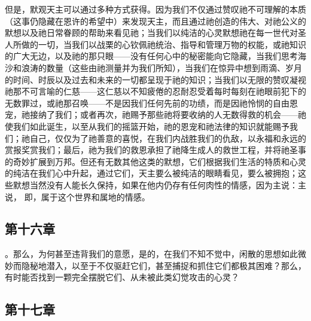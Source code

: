 \par

但是，默观天主可以通过多种方式获得。因为我们不仅通过赞叹祂不可理解的本质（这事仍隐藏在恩许的希望中）来发现天主，而且通过祂创造的伟大、对祂公义的默想以及祂日常眷顾的帮助来看见祂；当我们以纯洁的心灵默想祂在每一世代对圣人所做的一切，当我们以战栗的心钦佩祂统治、指导和管理万物的权能，或祂知识的广大无边，以及祂的那只眼——没有任何心中的秘密能向它隐藏，当我们思考海沙和浪涛的数量（这些由祂测量并为我们所知），当我们在惊异中想到雨滴、岁月的时间、时辰以及过去和未来的一切都呈现于祂的知识；当我们以无限的赞叹凝视祂那不可言喻的仁慈——这仁慈以不知疲倦的忍耐忍受着每时每刻在祂眼前犯下的无数罪过，或祂那召唤——不是因我们任何先前的功绩，而是因祂怜悯的自由恩宠，祂接纳了我们；或者再次，祂赐予那些祂将要收纳的人无数得救的机会——祂使我们如此诞生，以至从我们的摇篮开始，祂的恩宠和祂法律的知识就能赐予我们；祂自己，仅仅为了祂善意的喜悦，在我们内战胜我们的仇敌，以永福和永远的赏报奖赏我们；最后，祂为我们的救恩承担了祂降生成人的救世工程，并将祂圣事的奇妙扩展到万邦。但还有无数其他这类的默想，它们根据我们生活的特质和心灵的纯洁在我们心中升起，通过它们，天主要么被纯洁的眼睛看见，要么被拥抱；这些默想当然没有人能长久保持，如果在他内仍存有任何肉性的情感，因为主说：主说，  即，属于这个世界和属地的情感。\par


\subsection{第十六章}

\par

。那么，为何甚至违背我们的意愿，是的，在我们不知不觉中，闲散的思想如此微妙而隐秘地潜入，以至于不仅驱赶它们，甚至捕捉和抓住它们都极其困难？那么，有时能否找到一颗完全摆脱它们、从未被此类幻觉攻击的心灵？\par


\subsection{第十七章}

\par

